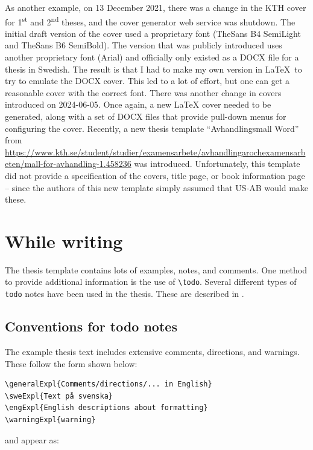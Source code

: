 \documentclass[12pt, twoside]{article}
\begin{document}
As another example, on 13 December 2021, there was a change in the \gls{KTH} cover for 1\textsuperscript{st} and 2\textsuperscript{nd} theses, and the cover generator web service was shutdown. The initial draft version of the cover used a proprietary font (TheSans B4 SemiLight and TheSans B6 SemiBold). The version that was publicly introduced uses another proprietary font (Arial) and officially only existed as a DOCX file for a thesis in Swedish. The result is that I had to make my own version in \LaTeX\  to try to emulate the DOCX cover. This led to a lot of effort, but one can get a reasonable cover with the correct font. There was another change in covers introduced on 2024-06-05. Once again, a new \LaTeX{} cover needed to be generated, along with a set of DOCX files that provide pull-down menus for configuring the cover. Recently, a new thesis template \enquote{\foreignlanguage{swedish}{Avhandlingsmall Word}} from
\url{https://www.kth.se/student/studier/examensarbete/avhandlingarochexamensarbeten/mall-for-avhandling-1.458236} was introduced. Unfortunately, this template did not provide a specification of the covers, title page, or book information page -- since the authors of this new template simply assumed that US-AB would make these.

\section{While writing}
The thesis template contains lots of examples, notes, and comments. One method to provide additional information is the use of \texttt{\textbackslash todo}. Several different types of \texttt{todo} notes have been used in the thesis. These are described in .

\subsection{Conventions for todo notes}
\label{sec:todonotes}

The example thesis text includes extensive comments, directions, and warnings. These follow the form shown below:
\begin{lstlisting}
\generalExpl{Comments/directions/... in English}
\sweExpl{Text på svenska}
\engExpl{English descriptions about formatting}
\warningExpl{warning}  
\end{lstlisting}
and appear as:
\end{document}
